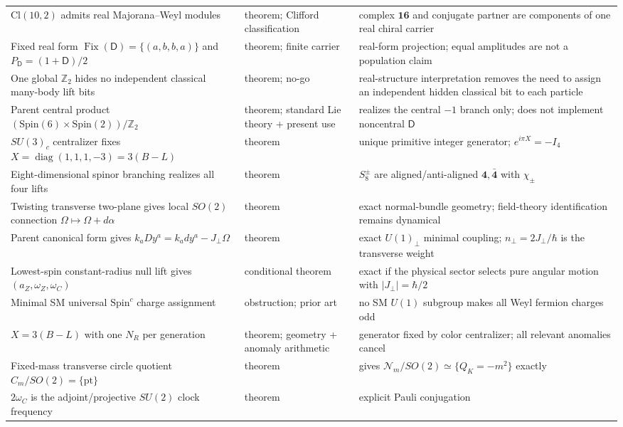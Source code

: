 \documentclass[11pt]{article}
\theoremstyle{definition}\newtheorem{definition}[theorem]{Definition}
\theoremstyle{remark}\newtheorem{remark}[theorem]{Remark}\newtheorem{conjecture}[theorem]{Conjecture}
\begin{document}
\begin{longtable}{>{\raggedright\arraybackslash}p{} >{\raggedright\arraybackslash}p{} >{\raggedright\arraybackslash}p{}}
$\mathrm{Cl}(10,2)$ admits real Majorana--Weyl modules & theorem; Clifford classification & complex $\mathbf{16}$ and conjugate partner are components of one real chiral carrier\\
Fixed real form $\operatorname{Fix}(\mathsf D)=\{(a,b,b,a)\}$ and $P_{\mathsf D}=(1+\mathsf D)/2$ & theorem; finite carrier & real-form projection; equal amplitudes are not a population claim\\
One global $\mathbb Z_2$ hides no independent classical many-body lift bits & theorem; no-go & real-structure interpretation removes the need to assign an independent hidden classical bit to each particle\\
Parent central product $(\mathrm{Spin}(6)\times\mathrm{Spin}(2))/\mathbb Z_2$ & theorem; standard Lie theory + present use & realizes the central $-1$ branch only; does not implement noncentral $\mathsf D$\\
$SU(3)_c$ centralizer fixes $X=\operatorname{diag}(1,1,1,-3)=3(B-L)$ & theorem & unique primitive integer generator; $e^{i\pi X}=-I_4$\\
Eight-dimensional spinor branching realizes all four lifts & theorem & $S_8^\pm$ are aligned/anti-aligned $\mathbf4,\bar{\mathbf4}$ with $\chi_\pm$\\
Twisting transverse two-plane gives local $SO(2)$ connection $\Omega\mapsto\Omega+d\alpha$ & theorem & exact normal-bundle geometry; field-theory identification remains dynamical\\
Parent canonical form gives $k_aDy^a=k_a dy^a-J_\perp\Omega$ & theorem & exact $U(1)_\perp$ minimal coupling; $n_\perp=2J_\perp/\hbar$ is the transverse weight\\
Lowest-spin constant-radius null lift gives $(a_Z,\omega_Z,\omega_C)$ & conditional theorem & exact if the physical sector selects pure angular motion with $|J_\perp|=\hbar/2$\\
Minimal SM universal $\mathrm{Spin}^c$ charge assignment & obstruction; prior art & no SM $U(1)$ subgroup makes all Weyl fermion charges odd\\
$X=3(B-L)$ with one $N_R$ per generation & theorem; geometry + anomaly arithmetic & generator fixed by color centralizer; all relevant anomalies cancel\\
Fixed-mass transverse circle quotient $C_m/SO(2)=\{\mathrm{pt}\}$ & theorem & gives $\mathcal N_m/SO(2)\simeq\{Q_K=-m^2\}$ exactly\\
$2\omega_C$ is the adjoint/projective $SU(2)$ clock frequency & theorem & explicit Pauli conjugation\\

\end{longtable}
\end{document}
